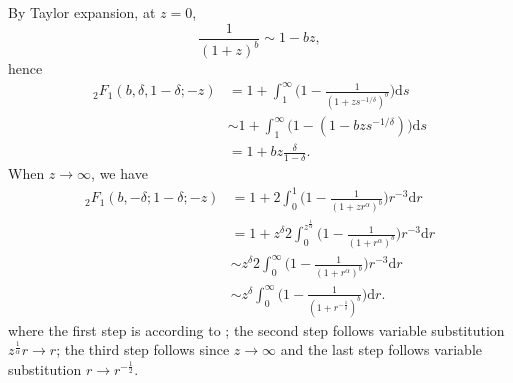 \documentclass[12pt,draftclsnofoot,journal,onecolumn]{IEEEtran}
\def\dd{\mathrm{d}}
\begin{document}
\begin{IEEEproof}
	By Taylor expansion, at $z=0$,
	\begin{equation}\label{eq:Taylor}
	\frac{1}{(1+z)^b} \sim 1-bz,
	\end{equation}	
	hence
	\begin{align}\label{eq:2F1_asymp}
	_2F_1(b,\delta,1-\delta;-z) &= 1+ \int_1^\infty \Big(1-\frac{1}{(1+z s^{-1/\delta})^b} \Big)\dd s \nonumber \\
	&\sim 1+ \int_1^\infty \Big(1-(1- bz s^{-1/\delta}) \Big)\dd s \nonumber \\
	&= 1+bz\frac{\delta}{1-\delta}.
	\end{align}
	\allowdisplaybreaks
	When $z\to \infty$, we have
	\begin{align}
	_2F_1(b,-\delta; 1-\delta; -z) &= 1 + 2\int_0^1 \Big(1-\frac{1}{(1+z r^\alpha)^b}\Big) r^{-3} \dd r \nonumber \\
	&= 1+ z^\delta 2\int_0^{z^{\frac{1}{\alpha}}} \Big(1-\frac{1}{(1+r^\alpha)^b}\Big) r^{-3} \dd r \nonumber \\
	&\sim z^\delta 2\int_0^{\infty} \Big(1-\frac{1}{(1+r^\alpha)^b}\Big) r^{-3} \dd r \nonumber \\
	&\sim z^\delta \int_0^{\infty} \Big(1-\frac{1}{(1+r^{-\frac{1}{\delta}})^b}\Big) \dd r.
	\end{align}	
	where the first step is according to \cite[eq. (23)]{MHmeta}; the second step follows variable substitution $z^{\frac{1}{\alpha}}r\to r$; the third step follows since $z\to \infty$ and the last step follows variable substitution $r\to r^{-\frac{1}{2}}$.
\end{IEEEproof}
\end{document}
